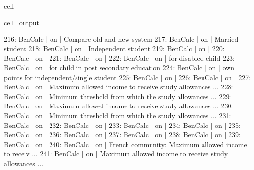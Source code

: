 \documentclass[letterpaper,10pt,english]{sphinxmanual}
\begin{document}
\begin{sphinxuseclass}{cell}
\begin{sphinxuseclass}{cell_output}
\begin{sphinxVerbatim}[commandchars=\\\{\}]
216: BenCalc     | on                                                       |    Compare old and new system 
217: BenCalc     | on                                                       |    Married student 
218: BenCalc     | on                                                       |    Independent student 
219: BenCalc     | on                                                       |     
220: BenCalc     | on                                                       |     
221: BenCalc     | on                                                       |     
222: BenCalc     | on                                                       |    for disabled child  
223: BenCalc     | on                                                       |    for child in post secondary education 
224: BenCalc     | on                                                       |    own points for  independent/single student 
225: BenCalc     | on                                                       |     
226: BenCalc     | on                                                       |     
227: BenCalc     | on                                                       |    Maximum allowed income to receive study allowances ... 
228: BenCalc     | on                                                       |    Minimum threshold from which the study allowances  ... 
229: BenCalc     | on                                                       |    Maximum allowed income to receive study allowances ... 
230: BenCalc     | on                                                       |    Minimum threshold from which the study allowances  ... 
231: BenCalc     | on                                                       |     
232: BenCalc     | on                                                       |     
233: BenCalc     | on                                                       |     
234: BenCalc     | on                                                       |     
235: BenCalc     | on                                                       |     
236: BenCalc     | on                                                       |     
237: BenCalc     | on                                                       |     
238: BenCalc     | on                                                       |     
239: BenCalc     | on                                                       |     
240: BenCalc     | on                                                       |    French community: Maximum allowed income to receiv ... 
241: BenCalc     | on                                                       |    Maximum allowed income to receive study allowances ... 

\end{sphinxVerbatim}
\end{sphinxuseclass}
\end{sphinxuseclass}
\end{document}
